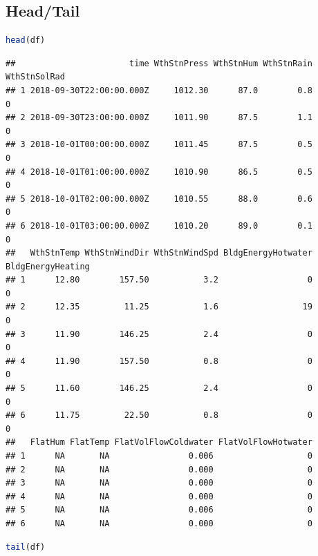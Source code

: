 \documentclass[
]{book}
\begin{document}
\hypertarget{headtail}{%
\subsection{Head/Tail}\label{headtail}}

\begin{lstlisting}[language=R]
head(df)
\end{lstlisting}

\begin{lstlisting}
##                       time WthStnPress WthStnHum WthStnRain WthStnSolRad
## 1 2018-09-30T22:00:00.000Z     1012.30      87.0        0.8            0
## 2 2018-09-30T23:00:00.000Z     1011.90      87.5        1.1            0
## 3 2018-10-01T00:00:00.000Z     1011.45      87.5        0.5            0
## 4 2018-10-01T01:00:00.000Z     1010.90      86.5        0.5            0
## 5 2018-10-01T02:00:00.000Z     1010.55      88.0        0.6            0
## 6 2018-10-01T03:00:00.000Z     1010.20      89.0        0.1            0
##   WthStnTemp WthStnWindDir WthStnWindSpd BldgEnergyHotwater BldgEnergyHeating
## 1      12.80        157.50           3.2                  0                 0
## 2      12.35         11.25           1.6                 19                 0
## 3      11.90        146.25           2.4                  0                 0
## 4      11.90        157.50           0.8                  0                 0
## 5      11.60        146.25           2.4                  0                 0
## 6      11.75         22.50           0.8                  0                 0
##   FlatHum FlatTemp FlatVolFlowColdwater FlatVolFlowHotwater
## 1      NA       NA                0.006                   0
## 2      NA       NA                0.000                   0
## 3      NA       NA                0.000                   0
## 4      NA       NA                0.000                   0
## 5      NA       NA                0.006                   0
## 6      NA       NA                0.000                   0
\end{lstlisting}

\begin{lstlisting}[language=R]
tail(df)
\end{lstlisting}
\end{document}
